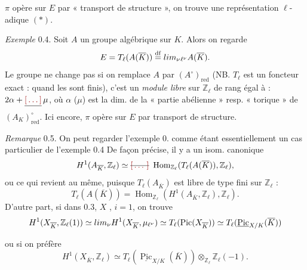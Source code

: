 \documentclass[11pt,a4paper]{article}
\begin{document}
 $\pi$ opère sur \struck{\ill{}} $E$ par « transport de structure », on trouve une représentation $\ell$-adique $(*)$.

\emph{Exemple} 0.4. Soit $A$ un  groupe algébrique  sur $K$. Alors on regarde
\[
  E = T_\ell(A(\overline{K})) \overset{\mathrm{df}}{=} \varprojlim_\nu {}_{\ell^\nu}A(\overline{K}) .
\]
\struck{\ill{}} Le groupe ne change pas si on remplace $A$ par $(A^{\circ})_{\mathrm{red}}$ (NB. $T_\ell$ est un foncteur exact : quand les  sont finis), c'est un  \emph{module libre} sur $\mathbb{Z}_\ell$ de rang égal à : $2\alpha + \struck{\ill{}}\,\mu$, où $\alpha$ ($\mu$) est la dim. de la « partie abélienne » resp.  « torique » de $(A_K)^{\circ}_{\mathrm{red}}$. Ici encore, $\pi$ opère sur $E$ par transport de structure.

\emph{Remarque} 0.5. On peut regarder l'exemple 0. comme étant essentiellement  un cas particulier de l'exemple 0.4 
De façon précise, il y a un isom. canonique
\[
  H^1(A_{\overline{K}}, \mathbb{Z}_\ell) \simeq \text{\struck{\ill{}}}\ \operatorname{Hom}_{\mathbb{Z}_\ell}(T_\ell(A(\overline{K})), \mathbb{Z}_\ell) ,
\]
ou ce qui revient au même, puisque $T_\ell(A_{\overline{K}})$ est libre de type fini sur $\mathbb{Z}_\ell$ :
\[
  T_\ell(A(\overline{K})) = \operatorname{Hom}_{\mathbb{Z}_\ell}(H^1(A_{\overline{K}}, \mathbb{Z}_\ell), \mathbb{Z}_\ell) .
\]
D'autre part,  si \struck{\ill{}} dans 0.3, $X$ ,  $i = 1$, on trouve
\[
  H^1(X_{\overline{K}}, \mathbb{Z}_\ell(1)) \simeq \varprojlim_\nu H^1(X_{\overline{K}}, \mu_{\ell^\nu}) \simeq T_\ell(\operatorname{Pic}(X_{\overline{K}}))
  \simeq T_\ell(\underline{\operatorname{Pic}}_{X/K}(\overline{K}))
\]

ou si on préfère
\[
  H^1(X_{\overline{K}}, \mathbb{Z}_\ell) \simeq T_\ell(\underline{\operatorname{Pic}}_{X/K}(\overline{K})) \otimes_{\mathbb{Z}_\ell} \mathbb{Z}_\ell(-1) .
\]
\end{document}
